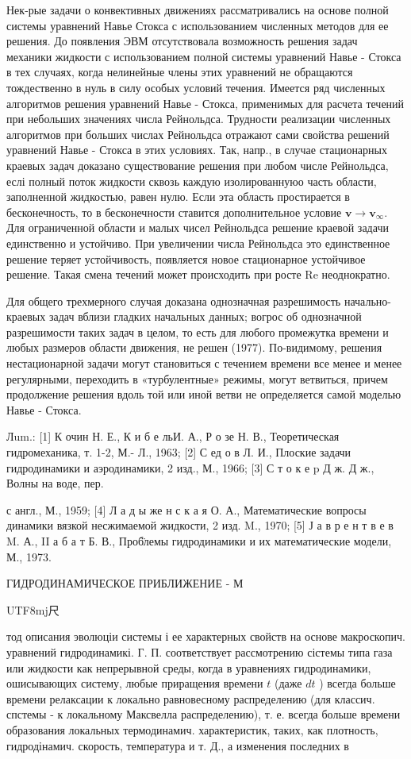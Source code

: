 \documentclass[10pt]{article}
\begin{document}
Нек-рые задачи о конвективных движениях рассматривались на основе полной системы уравнений Навье Стокса с использованием численных методов для ее решения. До появления ЭВМ отсутствовала возможность решения задач механики жидкости с использованием полной системы уравнений Навье - Стокса в тех случаях, когда нелинейные члены этих уравнений не обращаются тождественно в нуль в силу особых условий течения. Имеется ряд численных алгоритмов решения уравнений Навье - Стокса, применимых для расчета течений при небольших значениях числа Рейнольдса. Трудности реализации численных алгоритмов при больших числах Рейнольдса отражают сами свойства решений уравнений Навье - Стокса в этих условиях. Так, напр., в случае стационарных краевых задач доказано существование решения при любом числе Рейнольдса, еслі полный поток жидкости сквозь каждую изолированнуюо часть области, заполненной жидкостью, равен нулю. Если эта область простирается в бесконечность, то в бесконечности ставится дополнительное условие $\boldsymbol{v} \rightarrow \boldsymbol{v}_{\infty}$. Для ограниченной области и малых чисел Рейнольдса решение краевой задачи единственно и устойчиво. При увеличении числа Рейнольдса это единственное решение теряет устойчивость, появляется новое стационарное устойчивое решение. Такая смена течений может происходить при росте Re неоднократно.



Для общего трехмерного случая доказана однозначная разрешимость начально-краевых задач вблизи гладких начальных данных; вогрос об однозначной разрешимости таких задач в целом, то есть для любого промежутка времени и любых размеров области движения, не решен (1977). По-видимому, решения нестационарной задачи могут становиться с течением времени все менее и менее регулярными, переходить в «турбулентные» режимы, могут ветвиться, причем продолжение решения вдоль той или иной ветви не определяется самой моделью Навье - Стокса.



Лum.: [1] К очин Н. Е., К и б е льИ. А., Р о зе Н. В., Теоретическая гидромеханика, т. 1-2, М.- Л., 1963; [2] С ед о в Л. И., Плоские задачи гидродинамики и аэродинамики, 2 изд., М., 1966; [3] С т о к е p Д ж. Д ж., Волны на воде, пер.

с англ., М., 1959; [4] Л а д ы же н с к а я О. А., Математические вопросы динамики вязкой несжимаемой жидкости, 2 изд. M., 1970; [5] Ј а в р е н т в е в M. А., II а б а т Б. В., Проб̈лемы гидродинамики и их математические модели, М., 1973.



ГИДРОДИНАМИЧЕСКОЕ ПРИБЛИЖЕНИЕ - М\begin{CJK}{UTF8}{mj}尺\end{CJK}тод описания эволюціи системы і ее характерных свойств на основе макроскопич. уравнений гидродинамикі. Г. П. соответствует рассмотрению сістемы типа газа или жидкости как непрерывной среды, когда в уравнениях гидродинамики, ошисывающих систему, любые приращения времени $t$ (даже $d t$ ) всегда больше времени релаксации к локально равновесному распределению (для классич. спстемы - к локальному Максвелла распределению), т. е. всегда больше времени образования локальных термодинамич. характеристик, таких, как плотность, гидродінамич. скорость, температура и т. Д., а изменения последних в
\end{document}
